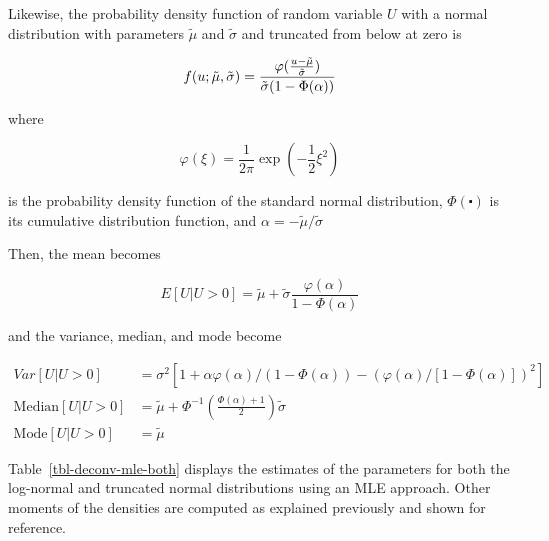 \documentclass[
  12pt]{article}
\theoremstyle{definition}
\theoremstyle{remark}
\begin{document}
Likewise, the probability density function of random variable \(U\) with
a normal distribution with parameters \(\tilde\mu\) and \(\tilde\sigma\)
and truncated from below at zero is

\[
  f(u\\;\tilde\mu,\tilde\sigma) = \frac{\varphi(\frac{u-\tilde\mu}{\tilde\sigma})}{\tilde\sigma (1-\Phi(\alpha))}
\]

where

\[
\varphi(\xi)=\frac{1}{2\pi}\exp(-\frac{1}{2}\xi^2)
\]

is the probability density function of the standard normal distribution,
\(\Phi(\centerdot)\) is its cumulative distribution function, and
\(\alpha=-\tilde\mu/\tilde\sigma\)

Then, the mean becomes

\[
E[U|U>0]=\tilde\mu+\tilde\sigma\frac{\varphi(\alpha)}{1-\Phi(\alpha)}
\]

and the variance, median, and mode become

\[
\begin{aligned}  
Var[U|U>0]&=\sigma^2[1+\alpha\varphi(\alpha)/(1-\Phi(\alpha))-(\varphi(\alpha)/[1-\Phi(\alpha)])^2]\\
\text{Median}[U|U>0]&=\tilde\mu+\Phi^{-1}\left(\frac{\Phi(\alpha)+1}{2}\right)\tilde\sigma \\ 
\text{Mode}[U|U>0]&=\tilde\mu
\end{aligned}
\]

Table~\ref{tbl-deconv-mle-both} displays the estimates of the parameters
for both the log-normal and truncated normal distributions using an MLE
approach. Other moments of the densities are computed as explained
previously and shown for reference.
\end{document}
